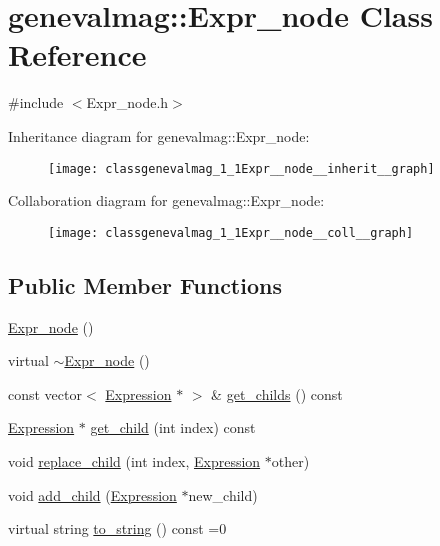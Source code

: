 \hypertarget{classgenevalmag_1_1Expr__node}{
\section{genevalmag::Expr\_\-node Class Reference}
\label{classgenevalmag_1_1Expr__node}
}


{\ttfamily \#include $<$Expr\_\-node.h$>$}



Inheritance diagram for genevalmag::Expr\_\-node:\nopagebreak
\begin{figure}[H]
\begin{center}
\leavevmode
\texttt{[image: classgenevalmag\_1\_1Expr\_\_node\_\_inherit\_\_graph]}
\end{center}
\end{figure}


Collaboration diagram for genevalmag::Expr\_\-node:\nopagebreak
\begin{figure}[H]
\begin{center}
\leavevmode
\texttt{[image: classgenevalmag\_1\_1Expr\_\_node\_\_coll\_\_graph]}
\end{center}
\end{figure}
\subsection*{Public Member Functions}
\begin{DoxyCompactItemize}
\item 
\hyperlink{classgenevalmag_1_1Expr__node_af8c84be806b49faef74651ec80f9d34d}{Expr\_\-node} ()
\item 
virtual \hyperlink{classgenevalmag_1_1Expr__node_aed3c4a68961a70c4f41bf100bfac7db9}{$\sim$Expr\_\-node} ()
\item 
const vector$<$ \hyperlink{classgenevalmag_1_1Expression}{Expression} $\ast$ $>$ \& \hyperlink{classgenevalmag_1_1Expr__node_a35298ede3bb76a765ce4367a589383cc}{get\_\-childs} () const 
\item 
\hyperlink{classgenevalmag_1_1Expression}{Expression} $\ast$ \hyperlink{classgenevalmag_1_1Expr__node_afd22b5e20b8723e957587aafe4e8e724}{get\_\-child} (int index) const 
\item 
void \hyperlink{classgenevalmag_1_1Expr__node_a951f8db517c231456781d10961ef8dba}{replace\_\-child} (int index, \hyperlink{classgenevalmag_1_1Expression}{Expression} $\ast$other)
\item 
void \hyperlink{classgenevalmag_1_1Expr__node_a11c96ee7ecda3b52639b2f8879aafea2}{add\_\-child} (\hyperlink{classgenevalmag_1_1Expression}{Expression} $\ast$new\_\-child)
\item 
virtual string \hyperlink{classgenevalmag_1_1Expr__node_adea1d8fbc1b01f018e18cedad871f6a7}{to\_\-string} () const =0
\end{DoxyCompactItemize}
